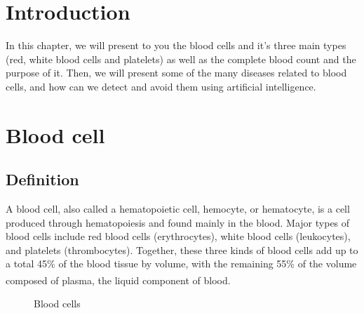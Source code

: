 \section{Introduction}
\vspace{0.2in}
\hspace*{0.16in}

In this chapter, we will present to you the blood cells and it's three main types (red, white blood cells and platelets) as well as the complete blood count and the purpose of it. Then, we will present some of the many diseases related to blood cells, and how can we detect and avoid them using artificial intelligence.

\section{Blood cell}
\subsection{Definition}

A blood cell, also called a hematopoietic cell, hemocyte, or hematocyte, is a cell produced through hematopoiesis and found mainly in the blood. Major types of blood cells include red blood cells (erythrocytes), white blood cells (leukocytes), and platelets (thrombocytes). Together, these three kinds of blood cells add up to a total 45\% of the blood tissue by volume, with the remaining 55\% of the volume composed of plasma, the liquid component of blood. \textsuperscript{\cite{hopkins1993human}}\\

\vspace{0.1in}

\begin{figure}[h]
\centering
  \vspace{-0.1in}
    \centerline{}
    \caption{Blood cells}
\end{figure}

